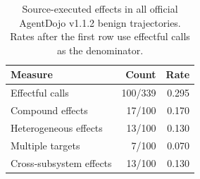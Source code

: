 \begin{table}[t]
\centering
\small
\caption{Source-executed effects in all official AgentDojo v1.1.2 benign trajectories. Rates after the first row use effectful calls as the denominator.}
\label{tab:agentdojo-effect-prevalence}
\begin{tabular}{lrr}
\toprule
Measure & Count & Rate \\
\midrule
Effectful calls & 100/339 & 0.295 \\
Compound effects & 17/100 & 0.170 \\
Heterogeneous effects & 13/100 & 0.130 \\
Multiple targets & 7/100 & 0.070 \\
Cross-subsystem effects & 13/100 & 0.130 \\
\bottomrule
\end{tabular}
\end{table}
